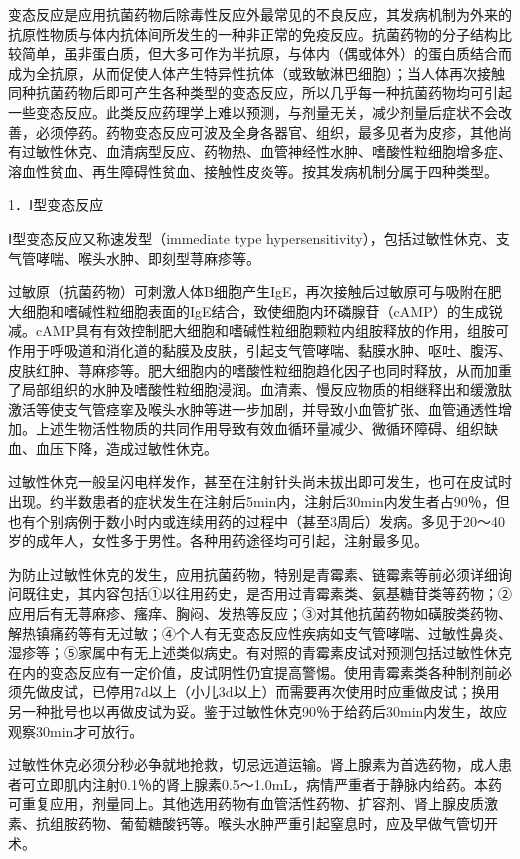 变态反应是应用抗菌药物后除毒性反应外最常见的不良反应，其发病机制为外来的抗原性物质与体内抗体间所发生的一种非正常的免疫反应。抗菌药物的分子结构比较简单，虽非蛋白质，但大多可作为半抗原，与体内（偶或体外）的蛋白质结合而成为全抗原，从而促使人体产生特异性抗体（或致敏淋巴细胞）；当人体再次接触同种抗菌药物后即可产生各种类型的变态反应，所以几乎每一种抗菌药物均可引起一些变态反应。此类反应药理学上难以预测，与剂量无关，减少剂量后症状不会改善，必须停药。药物变态反应可波及全身各器官、组织，最多见者为皮疹，其他尚有过敏性休克、血清病型反应、药物热、血管神经性水肿、嗜酸性粒细胞增多症、溶血性贫血、再生障碍性贫血、接触性皮炎等。按其发病机制分属于四种类型。

1．Ⅰ型变态反应

Ⅰ型变态反应又称速发型（immediate type
hypersensitivity），包括过敏性休克、支气管哮喘、喉头水肿、即刻型荨麻疹等。

过敏原（抗菌药物）可刺激人体B细胞产生IgE，再次接触后过敏原可与吸附在肥大细胞和嗜碱性粒细胞表面的IgE结合，致使细胞内环磷腺苷（cAMP）的生成锐减。cAMP具有有效控制肥大细胞和嗜碱性粒细胞颗粒内组胺释放的作用，组胺可作用于呼吸道和消化道的黏膜及皮肤，引起支气管哮喘、黏膜水肿、呕吐、腹泻、皮肤红肿、荨麻疹等。肥大细胞内的嗜酸性粒细胞趋化因子也同时释放，从而加重了局部组织的水肿及嗜酸性粒细胞浸润。血清素、慢反应物质的相继释出和缓激肽激活等使支气管痉挛及喉头水肿等进一步加剧，并导致小血管扩张、血管通透性增加。上述生物活性物质的共同作用导致有效血循环量减少、微循环障碍、组织缺血、血压下降，造成过敏性休克。

过敏性休克一般呈闪电样发作，甚至在注射针头尚未拔出即可发生，也可在皮试时出现。约半数患者的症状发生在注射后5min内，注射后30min内发生者占90％，但也有个别病例于数小时内或连续用药的过程中（甚至3周后）发病。多见于20～40岁的成年人，女性多于男性。各种用药途径均可引起，注射最多见。

为防止过敏性休克的发生，应用抗菌药物，特别是青霉素、链霉素等前必须详细询问既往史，其内容包括①以往用药史，是否用过青霉素类、氨基糖苷类等药物；②应用后有无荨麻疹、瘙痒、胸闷、发热等反应；③对其他抗菌药物如磺胺类药物、解热镇痛药等有无过敏；④个人有无变态反应性疾病如支气管哮喘、过敏性鼻炎、湿疹等；⑤家属中有无上述类似病史。有对照的青霉素皮试对预测包括过敏性休克在内的变态反应有一定价值，皮试阴性仍宜提高警惕。使用青霉素类各种制剂前必须先做皮试，已停用7d以上（小儿3d以上）而需要再次使用时应重做皮试；换用另一种批号也以再做皮试为妥。鉴于过敏性休克90％于给药后30min内发生，故应观察30min才可放行。

过敏性休克必须分秒必争就地抢救，切忌远道运输。肾上腺素为首选药物，成人患者可立即肌内注射0.1％的肾上腺素0.5～1.0mL，病情严重者于静脉内给药。本药可重复应用，剂量同上。其他选用药物有血管活性药物、扩容剂、肾上腺皮质激素、抗组胺药物、葡萄糖酸钙等。喉头水肿严重引起窒息时，应及早做气管切开术。

